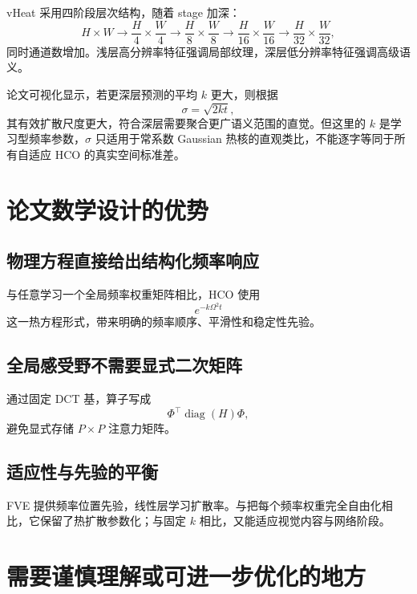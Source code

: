 \documentclass[UTF8,12pt,a4paper,fontset=none]{ctexart}
\numberwithin{equation}{section}
\newcommand{\diag}{\operatorname{diag}}
\begin{document}
vHeat 采用四阶段层次结构，随着 stage 加深：
\begin{equation}
  H\times W
  \to\frac H4\times\frac W4
  \to\frac H8\times\frac W8
  \to\frac H{16}\times\frac W{16}
  \to\frac H{32}\times\frac W{32},
\end{equation}
同时通道数增加。浅层高分辨率特征强调局部纹理，深层低分辨率特征强调高级语义。

论文可视化显示，若更深层预测的平均 $k$ 更大，则根据
\begin{equation}
  \sigma=\sqrt{2kt},
\end{equation}
其有效扩散尺度更大，符合深层需要聚合更广语义范围的直觉。但这里的 $k$ 是学习型频率参数，$\sigma$ 只适用于常系数 Gaussian 热核的直观类比，不能逐字等同于所有自适应 HCO 的真实空间标准差。

\section{论文数学设计的优势}

\subsection{物理方程直接给出结构化频率响应}

与任意学习一个全局频率权重矩阵相比，HCO 使用
\begin{equation}
  e^{-k\Omega^2t}
\end{equation}
这一热方程形式，带来明确的频率顺序、平滑性和稳定性先验。

\subsection{全局感受野不需要显式二次矩阵}

通过固定 DCT 基，算子写成
\begin{equation}
  \Phi^{\top}\diag(H)\Phi,
\end{equation}
避免显式存储 $P\times P$ 注意力矩阵。

\subsection{适应性与先验的平衡}

FVE 提供频率位置先验，线性层学习扩散率。与把每个频率权重完全自由化相比，它保留了热扩散参数化；与固定 $k$ 相比，又能适应视觉内容与网络阶段。

\section{需要谨慎理解或可进一步优化的地方}
\end{document}
